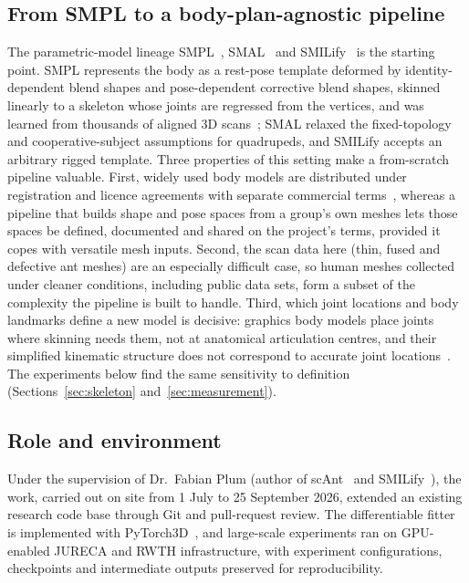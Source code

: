 \subsection{From SMPL to a body-plan-agnostic pipeline}

The parametric-model lineage SMPL~\cite{smpl}, SMAL~\cite{smal} and
SMILify~\cite{smilify} is the starting point. SMPL represents the body as a rest-pose
template deformed by identity-dependent blend shapes and pose-dependent corrective blend
shapes, skinned linearly to a skeleton whose joints are regressed from the vertices, and
was learned from thousands of aligned 3D scans~\cite{smplweb}; SMAL relaxed the
fixed-topology and cooperative-subject assumptions for quadrupeds, and SMILify accepts an
arbitrary rigged template. Three properties of this setting make a from-scratch pipeline
valuable. First, widely used body models are distributed under registration and licence
agreements with separate commercial terms~\cite{smplweb}, whereas a pipeline that builds
shape and pose spaces from a group's own meshes lets those spaces be defined, documented
and shared on the project's terms, provided it copes with versatile mesh inputs. Second,
the scan data here (thin, fused and defective ant meshes) are an especially difficult
case, so human meshes collected under cleaner conditions, including public data sets,
form a subset of the complexity the pipeline is built to handle. Third, which joint
locations and body landmarks define a new model is decisive: graphics body models place
joints where skinning needs them, not at anatomical articulation centres, and their
simplified kinematic structure does not correspond to accurate joint locations~\cite{keller}.
The experiments below find the same sensitivity to definition (Sections~\ref{sec:skeleton}
and~\ref{sec:measurement}).

\subsection{Role and environment}

Under the supervision of Dr.\ Fabian Plum (author of scAnt~\cite{scant} and SMILify~\cite{smilify}), the work,
carried out on site from 1 July to 25 September 2026, extended an existing research code
base through Git and pull-request review. The differentiable fitter is implemented with
PyTorch3D~\cite{pytorch3d}, and large-scale experiments ran on GPU-enabled JURECA and RWTH
infrastructure, with experiment configurations, checkpoints and intermediate outputs
preserved for reproducibility.
